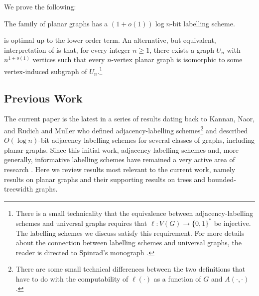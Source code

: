 \documentclass[kpfonts]{patmorin}
\let\ge\geqslant
\begin{document}
We prove the following:
\begin{thm}
  The family of planar graphs has a $(1+o(1))\log n$-bit labelling scheme.
\end{thm}


 is optimal up to the lower order term.  An alternative, but equivalent, interpretation of  is that, for every integer $n\ge 1$, there exists a graph $U_n$ with $n^{1+o(1)}$  vertices such that every $n$-vertex planar graph is isomorphic to some vertex-induced subgraph of $U_n$.\footnote{There is a small technicality that the equivalence between adjacency-labelling schemes and universal graphs requires that $\ell:V(G)\to\{0,1\}^*$ be injective.  The labelling schemes we discuss satisfy this requirement.  For more details about the connection between labelling schemes and universal graphs, the reader is directed to Spinrad's monograph \cite[Section~2.1]{spinrad:efficient}.} 

\subsection{Previous Work}

The current paper is the latest in a series of results dating back to Kannan, Naor, and Rudich \cite{kannan.naor.ea:implicit0,kannan.naor.ea:implicit} and Muller \cite{muller:local} who defined adjacency-labelling schemes\footnote{There are some small technical differences between the two definitions that have to do with the computability of $\ell(\cdot)$ as a function of $G$ and
$A(\cdot,\cdot)$.} and described $O(\log n)$-bit adjacency labelling schemes for several classes of graphs, including planar graphs.  Since this initial work, adjacency labelling schemes and, more generally, informative labelling schemes have remained a very active area of research \cite{adjiashvili.rotbart:labeling,alstrup.kaplan.ea:adjacency,abrahamsen.alstrup.ea:near-optimal,alstrup.dahlgaard.ea:sublinear,alstrup.gortz.ea:distance,alstrup.gavoille.ea:simpler,alstrup.rauhe:improved}. Here we review results most relevant to the current work, namely results on planar graphs and their supporting results on trees and bounded-treewidth graphs.
\end{document}
